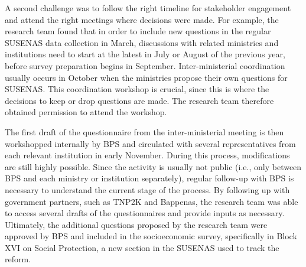 A second challenge was to follow the right timeline for stakeholder engagement and attend the right meetings where decisions were made. For example, the research team found that in order to include new questions in the regular SUSENAS data collection in March, discussions with related ministries and institutions need to start at the latest in July or August of the previous year, before survey preparation begins in September. Inter-ministerial coordination usually occurs in October when the ministries propose their own questions for SUSENAS. This coordination workshop is crucial, since this is where the decisions to keep or drop questions are made. The research team therefore obtained permission to attend the workshop.

The first draft of the questionnaire from the inter-ministerial meeting is then workshopped internally by BPS and circulated with several representatives from each relevant institution in early November. During this process, modifications are still highly possible. Since the activity is usually not public (i.e., only between BPS and each ministry or institution separately), regular follow-up with BPS is necessary to understand the current stage of the process. By following up with government partners, such as TNP2K and Bappenas, the research team was able to access several drafts of the questionnaires and provide inputs as necessary. Ultimately, the additional questions proposed by the research team were approved by BPS and included in the socioeconomic survey, specifically in Block XVI on Social Protection, a new section in the SUSENAS used to track the reform.

